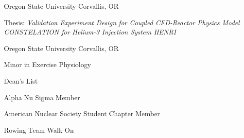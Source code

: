 
\begin{cventries}
  \cventry
    {} %
    {Oregon State University} %
    {Corvallis, OR} %
    {} %
    {
      \begin{cvitems} %
         \item{Thesis: \textit{Validation Experiment Design for Coupled CFD-Reactor Physics Model CONSTELATION for Helium-3 Injection System HENRI}}
      \end{cvitems}
    }

  \cventry
    {} %
    {Oregon State University} %
    {Corvallis, OR} %
    {} %
    {
      \begin{cvitems} %
         \item{Minor in Exercise Physiology}
         \vspace{0.5mm}
         \item{Dean's List \textemdash \ }
         \vspace{0.5mm}
         \item {Alpha Nu Sigma Member}
         \vspace{0.5mm}
         \item{American Nuclear Society Student Chapter Member}
         \vspace{0.5mm}
         \item {Rowing Team Walk-On \textemdash \ }
      \end{cvitems}
    }
    

\end{cventries}
